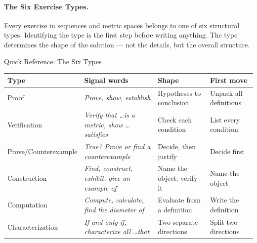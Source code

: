 \paragraph{The Six Exercise Types.}

Every exercise in sequences and metric spaces belongs to one of six
structural types. Identifying the type is the first step before
writing anything. The type determines the shape of the solution ---
not the details, but the overall structure.

\begin{toolkitbox}{Quick Reference: The Six Types}
\small
\renewcommand{\arraystretch}{1.3}
\begin{tabular}{p{} p{} p{} p{}}
\toprule
\textbf{Type} & \textbf{Signal words} & \textbf{Shape} & \textbf{First move} \\
\midrule
Proof &
  \textit{Prove, show, establish} &
  Hypotheses to conclusion &
  Unpack all definitions \\
Verification &
  \textit{Verify that \ldots is a metric, show \ldots satisfies} &
  Check each condition &
  List every condition \\
Prove/Counterexample &
  \textit{True? Prove or find a counterexample} &
  Decide, then justify &
  Decide first \\
Construction &
  \textit{Find, construct, exhibit, give an example of} &
  Name the object; verify it &
  Name the object \\
Computation &
  \textit{Compute, calculate, find the diameter of} &
  Evaluate from a definition &
  Write the definition \\
Characterization &
  \textit{If and only if, characterize all \ldots that} &
  Two separate directions &
  Split two directions \\
\bottomrule
\end{tabular}
\end{toolkitbox}

